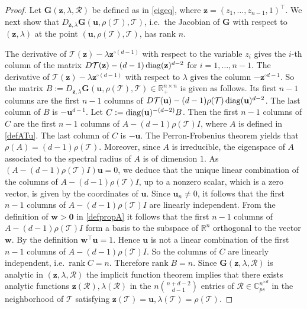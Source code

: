\documentclass{amsart}
\newcommand{\differential}{D}
\newcommand{\diag}{\operatorname{diag}}
\newcommand{\C}{\mathbb{C}}
\newcommand{\R}{\mathbb{R}}
\newcommand{\bG}{\mathbf{G}}
\newcommand{\uu}{\mathbf{u}}
\newcommand{\w}{\mathbf{w}}
\newcommand{\z}{\mathbf{z}}
\newcommand{\0}{\mathbf{0}}
\newcommand{\1}{\mathbf{1}}
\newcommand{\cR}{\mathcal{R}}
\newcommand{\cT}{\mathcal{T}}
\def\diag{\mathop{{\rm diag}}\nolimits}
\newcommand{\trans}{^\top}
\newcommand{\rank}{\mathrm{rank\;}}
\theoremstyle{remark}
\numberwithin{equation}{section} %
\begin{document}
 \begin{proof} 
%
 Let $\bG(\z,\lambda,\cR)$ be defined as in \eqref{eigeq}, where $\z=(z_1,\ldots,z_{n-1},1)\trans$.  We next show that $\differential_{\z,\lambda}\bG(\uu,\rho(\cT),\cT)$,  i.e.\ the Jacobian of $\bG$ with respect to $(\z, \lambda)$ at the point $(\uu,\rho(\cT),\cT)$, has rank $n$.  

The derivative of $\cT(\z)-\lambda\z^{\circ(d-1)}$ with respect to the variable $z_i$ gives the $i$-th column of the matrix
 $\differential\cT(\z)-(d-1)\diag(\z)^{d-2}$ for $i=1,\ldots,n-1$.  The derivative of $\cT(\z)-\lambda\z^{\circ(d-1)}$ with respect to $\lambda$
 gives the column $-\z^{\circ{d-1}}$.  So the matrix $B:=\differential_{\z,\lambda}\bG(\uu,\rho(\cT),\cT)\in\R_+^{n\times n}$ is given as follows.
 Its first $n-1$ columns are the first $n-1$ columns of $\differential\cT(\uu)-(d-1)\rho(\cT)\diag(\uu)^{d-2}$.  The last column of $B$ is $-\uu^{d-1}$.
 Let $C:=\diag(\uu)^{-(d-2)}B$.  Then the first $n-1$ columns of $C$ are the first $n-1$ columns of $A-(d-1)\rho(\cT)I$, where $A$ is defined in
 \eqref{defATu}.  The last column of $C$ is $-\uu$.   The Perron-Frobenius theorem
 yields that $\rho(A)=(d-1)\rho(\cT)$. Moreover, since $A$ is irreducible, the eigenspace of $A$
associated to the spectral radius of $A$ is of dimension $1$.
%
%
As $(A-(d-1)\rho(\cT)I)\uu=0$, we deduce that
 the unique linear combination of the columns of $A-(d-1)\rho(\cT)I$,  up to a nonzero scalar,  which is a zero vector, is given by the coordinates of $\uu$.
Since $\uu_{n}\neq 0$, it follows that
%
%
the first $n-1$ columns of $A-(d-1)\rho(\cT)I$
 are linearly independent.  From the definition of $\w>\0$ in \eqref{defpropA} it follows that the first $n-1$ columns of $A-(d-1)\rho(\cT)I$
 form a basis to the subspace of $\R^n$ orthogonal to the vector $\w$.  By the definition $\w\trans \uu=1$.  Hence $\uu$ is not a linear combination
 of the first $n-1$ columns of $A-(d-1)\rho(\cT)I$.  So the columns of $C$ are linearly independent, i.e.\ $\rank C=n$.  Therefore $\rank B=n$.
 Since $\bG(\z,\lambda,\cR)$ is analytic in $(\z,\lambda,\cR)$ the implicit function theorem implies that there exists analytic functions
 $\z(\cR),\lambda(\cR)$ in the $n{n+d-2\choose d-1}$ entries of $\cR\in\C^{n^{\times d}}_{ps}$ in the neighborhood of $\cT$ satisfying $\z(\cT)=\uu,\lambda(\cT)=\rho(\cT)$.


\end{proof}
\end{document}
